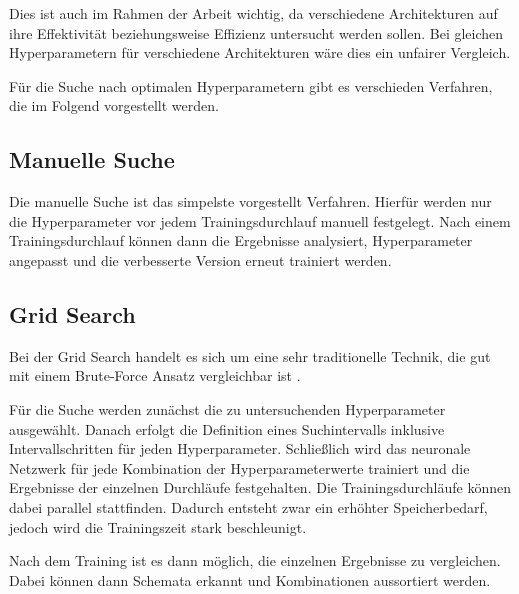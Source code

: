 Dies ist auch im Rahmen der Arbeit wichtig, da verschiedene Architekturen auf ihre Effektivität beziehungsweise Effizienz  untersucht werden sollen.
Bei gleichen Hyperparametern für verschiedene Architekturen wäre dies ein unfairer Vergleich.

Für die Suche nach optimalen Hyperparametern gibt es verschieden Verfahren, die im Folgend vorgestellt werden.

\subsection{Manuelle Suche}
Die manuelle Suche ist das simpelste vorgestellt Verfahren.
Hierfür werden nur die Hyperparameter vor jedem Trainingsdurchlauf manuell festgelegt.
Nach einem Trainingsdurchlauf können dann die Ergebnisse analysiert, Hyperparameter angepasst und die verbesserte Version erneut trainiert werden.


\subsection{Grid Search}
Bei der Grid Search handelt es sich um eine sehr traditionelle Technik, die gut mit einem Brute-Force Ansatz vergleichbar ist \cite{hyperparameters-grid-search}.
\newline

Für die Suche werden zunächst die zu untersuchenden Hyperparameter ausgewählt.
Danach erfolgt die Definition eines Suchintervalls inklusive Intervallschritten für jeden Hyperparameter.
Schließlich wird das neuronale Netzwerk für jede Kombination der Hyperparameterwerte trainiert und die Ergebnisse der einzelnen Durchläufe festgehalten.
Die Trainingsdurchläufe können dabei parallel stattfinden.
Dadurch entsteht zwar ein erhöhter Speicherbedarf, jedoch wird die Trainingszeit stark beschleunigt.

Nach dem Training ist es dann möglich, die einzelnen Ergebnisse zu vergleichen.
Dabei können dann Schemata erkannt und Kombinationen aussortiert werden.
\newline

